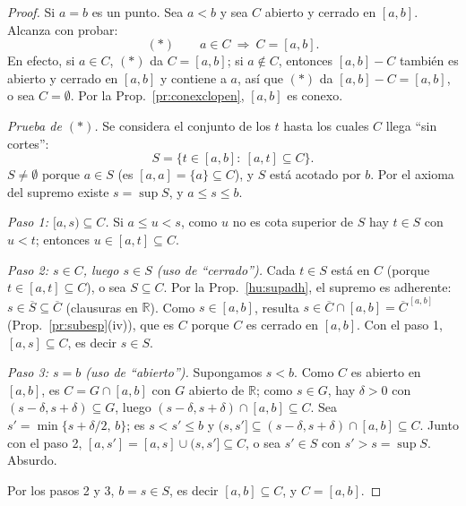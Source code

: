 \documentclass[11pt,a4paper]{article}
\newcommand{\figtit}[1]{\par\vspace{2pt}{\footnotesize\itshape #1}\par}
\theoremstyle{definition}
\theoremstyle{plain}
\newcommand{\R}{\mathbb{R}}
\newcommand{\cl}[1]{\overline{#1}}
\begin{document}
\begin{proof}
Si $a=b$ es un punto. Sea $a<b$ y sea $C$ abierto y cerrado en $[a,b]$. Alcanza con probar:
\[
(\ast)\qquad a\in C\ \Longrightarrow\ C=[a,b].
\]
En efecto, si $a\in C$, $(\ast)$ da $C=[a,b]$; si $a\notin C$, entonces $[a,b]-C$ también es abierto y cerrado en $[a,b]$ y contiene a $a$, así que $(\ast)$ da $[a,b]-C=[a,b]$, o sea $C=\emptyset$. Por la Prop.~\ref{pr:conexclopen}, $[a,b]$ es conexo.

\emph{Prueba de $(\ast)$.} Se considera el conjunto de los $t$ hasta los cuales $C$ llega ``sin cortes'':
\[
S=\{t\in[a,b]:\ [a,t]\subseteq C\}.
\]
$S\ne\emptyset$ porque $a\in S$ (es $[a,a]=\{a\}\subseteq C$), y $S$ está acotado por $b$. Por el axioma del supremo existe $s=\sup S$, y $a\le s\le b$.

\emph{Paso 1: $[a,s)\subseteq C$.} Si $a\le u<s$, como $u$ no es cota superior de $S$ hay $t\in S$ con $u<t$; entonces $u\in[a,t]\subseteq C$.

\emph{Paso 2: $s\in C$, luego $s\in S$ (uso de ``cerrado'').} Cada $t\in S$ está en $C$ (porque $t\in[a,t]\subseteq C$), o sea $S\subseteq C$. Por la Prop.~\ref{hu:supadh}, el supremo es adherente: $s\in\cl S\subseteq\cl C$ (clausuras en $\R$). Como $s\in[a,b]$, resulta $s\in\cl C\cap[a,b]=\cl C^{\,[a,b]}$ (Prop.~\ref{pr:subesp}(iv)), que es $C$ porque $C$ es cerrado en $[a,b]$. Con el paso 1, $[a,s]\subseteq C$, es decir $s\in S$.

\emph{Paso 3: $s=b$ (uso de ``abierto'').} Supongamos $s<b$. Como $C$ es abierto en $[a,b]$, es $C=G\cap[a,b]$ con $G$ abierto de $\R$; como $s\in G$, hay $\delta>0$ con $(s-\delta,s+\delta)\subseteq G$, luego $(s-\delta,s+\delta)\cap[a,b]\subseteq C$. Sea $s'=\min\{s+\delta/2,\,b\}$; es $s<s'\le b$ y $(s,s']\subseteq(s-\delta,s+\delta)\cap[a,b]\subseteq C$. Junto con el paso 2, $[a,s']=[a,s]\cup(s,s']\subseteq C$, o sea $s'\in S$ con $s'>s=\sup S$. Absurdo.

Por los pasos 2 y 3, $b=s\in S$, es decir $[a,b]\subseteq C$, y $C=[a,b]$.
\end{proof}

\begin{figure}[ht]
\centering
{}
\figtit{Figura 19. La prueba por supremo. ``Cerrado'' asegura que $C$ contiene al punto $s$ al que llega; ``abierto'' asegura que, si $s<b$, desde $s$ se puede seguir un poco más. Las dos cosas juntas sólo son compatibles con $s=b$.}
\end{figure}
\end{document}
